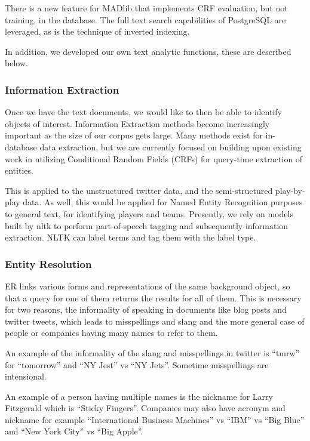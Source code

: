 \documentclass[11pt,onecolumn]{article}
\begin{document}
  There is a new feature for MADlib that implements CRF evaluation, but not 
	training, in the database.
  The full text search capabilities of PostgreSQL are leveraged,
  as is the technique of inverted indexing.

	In addition, we developed our own text analytic functions, these are
	described below.

    \subsubsection{Information Extraction}

    Once we have the text documents, we would like to then be able to identify
    objects of interest. Information Extraction methods become increasingly
    important as the size of our corpus gets large. Many methods exist for in-database data
    extraction, but we are currently focused on building upon existing work in
    utilizing Conditional Random Fields (CRFs) for query-time extraction of
    entities.

    This is applied to the unstructured twitter data,
    and the semi-structured play-by-play data.
    As well, this would be applied for Named Entity Recognition purposes to general text, for identifying players and teams.
		Presently, we rely on models built by nltk to perform part-of-speech 
		tagging and subsequently information extraction. NLTK can label 
		terms and tag them with the label type. 


    \subsubsection{Entity Resolution}
    \label{sec:SCER}

    ER links various forms and representations of the same background object,
    so that a query for one of them returns the results for all of them.
    This is necessary for two reasons,
    the informality of speaking in documents like blog posts and twitter tweets,
    which leads to misspellings and slang
    and the more  general case of people or companies having many names to refer to them.

    An example of the informality of the slang and misspellings in twitter is
		``tmrw'' for ``tomorrow'' and ``NY Jest'' vs ``NY Jets''. Sometime 
		misspellings are intensional.

    An example of a person having multiple names is the
    nickname for Larry Fitzgerald which is ``Sticky Fingers''.
		Companies may also have acronym and nickname
    for example ``International Business Machines'' vs ``IBM'' vs ``Big Blue''
    and ``New York City'' vs ``Big Apple''.
\end{document}
